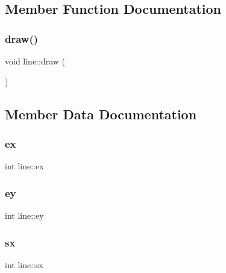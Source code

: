 \subsection{Member Function Documentation}
\mbox{\label{classline_ac3edc76a59ee53e240875513073c447c}} 
\subsubsection{\texorpdfstring{draw()}{draw()}}
{\footnotesize\ttfamily void line\+::draw (\begin{DoxyParamCaption}{ }\end{DoxyParamCaption})}



\subsection{Member Data Documentation}
\mbox{\label{classline_ab3aa6549e46960b1d65b6286b1e4a5c5}} 
\subsubsection{\texorpdfstring{ex}{ex}}
{\footnotesize\ttfamily int line\+::ex\hspace{0.3cm}{\ttfamily [private]}}

\mbox{\label{classline_a9967b1a26c3c8abf1906e5f5e12be9d3}} 
\subsubsection{\texorpdfstring{ey}{ey}}
{\footnotesize\ttfamily int line\+::ey\hspace{0.3cm}{\ttfamily [private]}}

\mbox{\label{classline_a75af55c0f7d0f1f113d12fd6e1d53ed0}} 
\subsubsection{\texorpdfstring{sx}{sx}}
{\footnotesize\ttfamily int line\+::sx\hspace{0.3cm}{\ttfamily [private]}}

